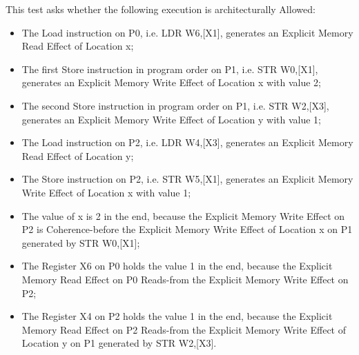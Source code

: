 This test asks whether the following execution is architecturally Allowed:

\begin{itemize}
  \item The Load instruction on P0, i.e. LDR W6,[X1], generates an Explicit Memory Read Effect of Location x;
  \item The first Store instruction in program order on P1, i.e. STR W0,[X1], generates an Explicit Memory Write Effect of Location x with value 2;
  \item The second Store instruction in program order on P1, i.e. STR W2,[X3], generates an Explicit Memory Write Effect of Location y with value 1;
  \item The Load instruction on P2, i.e. LDR W4,[X3], generates an Explicit Memory Read Effect of Location y;
  \item The Store instruction on P2, i.e. STR W5,[X1], generates an Explicit Memory Write Effect of Location x with value 1;
  \item The value of x is 2 in the end, because the Explicit Memory Write Effect on P2 is Coherence-before the Explicit Memory Write Effect of Location x on P1 generated by STR W0,[X1];
  \item The Register X6 on P0 holds the value 1 in the end, because the Explicit Memory Read Effect on P0 Reads-from the Explicit Memory Write Effect on P2;
  \item The Register X4 on P2 holds the value 1 in the end, because the Explicit Memory Read Effect on P2 Reads-from the Explicit Memory Write Effect of Location y on P1 generated by STR W2,[X3].
\end{itemize}
